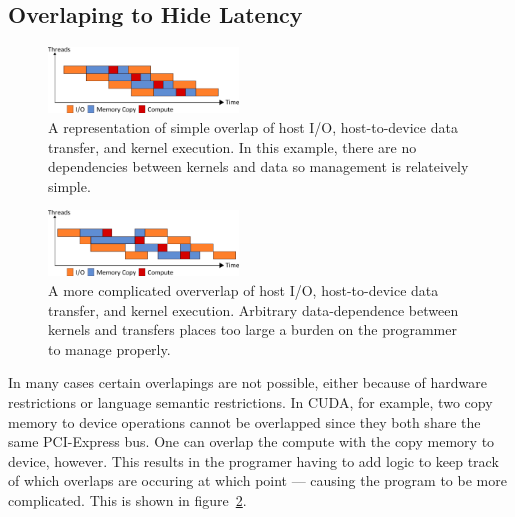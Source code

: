 \subsection{Overlaping to Hide Latency}



\begin{figure}
  \centering
    \includegraphics[width=0.45\textwidth]{fig/ord.png}
  \caption{A representation of simple overlap of host I/O, host-to-device data
           transfer, and kernel execution. In this example, there are no
           dependencies between kernels and data so management is relateively
           simple.}
  \label{fig:ord}
\end{figure}

\begin{figure}
  \centering
    \includegraphics[width=0.45\textwidth]{fig/unord.png}
  \caption{A more complicated oververlap of host I/O, host-to-device data
           transfer, and kernel execution. Arbitrary data-dependence between
           kernels and transfers places too large a burden on the programmer
           to manage properly.}
  \label{fig:unord}
\end{figure}

In many cases certain overlapings are not possible, either because of
  hardware restrictions or language semantic restrictions.
In CUDA, for example, two copy memory to device operations cannot be
overlapped since they both share the same PCI-Express bus.
One can overlap the compute with the copy memory to device, however.
This results in the programer having to add logic to keep track of which
  overlaps are occuring at which point --- causing the program to be
  more complicated.
This is shown in figure~\ref{fig:unord}.

 

